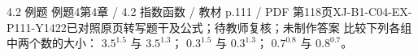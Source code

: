 \par\noindent\begin{minipage}{\linewidth}
\begin{bankitem}{4.2 例题 例题4}{第4章 / 4.2 指数函数 / 教材 p.111 / PDF 第118页}{XJ-B1-C04-EX-P111-Y1422}{已对照原页转写题干及公式；待教师复核；未制作答案}
比较下列各组中两个数的大小：
$3.5^{1.5}$ 与 $3.5^{1.3}$；
$0.3^{1.5}$ 与 $0.3^{1.3}$；
$0.7^{0.8}$ 与 $0.8^{0.7}$。
\end{bankitem}
\end{minipage}\par\medskip
